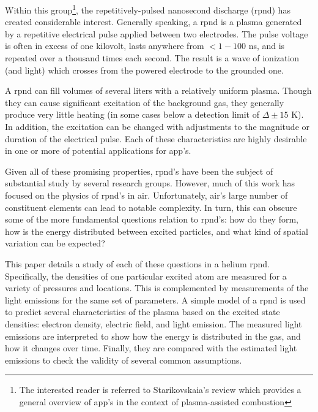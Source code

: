 Within this group\footnote{The interested reader is referred to Starikovskaia's
review \cite{Starikovskaia2006} which provides a general overview of \acs{app}'s
in the context of plasma-assisted combustion}, the repetitively-pulsed
nanosecond discharge (\acs{rpnd}) has created considerable interest. Generally
speaking, a \acs{rpnd} is a plasma generated by a repetitive electrical pulse
applied between two electrodes. The pulse voltage is often in excess of one
kilovolt, lasts anywhere from $<1-100$ ns, and is repeated over a thousand
times each second. The result is a wave of ionization (and light) which crosses
from the powered electrode to the grounded one.

A \acs{rpnd} can fill volumes of several liters with a relatively uniform
plasma. Though they can cause significant excitation of the background gas, they
generally produce very little heating (in some cases below a detection limit of
$\Delta \pm 15$ K). In addition, the excitation can be changed with adjustments
to the magnitude or duration of the electrical pulse. Each of these
characteristics are highly desirable in one or more of potential applications
for \acs{app}'s.

Given all of these promising properties, \acs{rpnd}'s have been the subject of
substantial study by several research groups. However, much of this work has
focused on the physics of \acs{rpnd}'s in air. Unfortunately, air's large number
of constituent elements can lead to notable complexity. In turn, this can
obscure some of the more fundamental questions relation to \acs{rpnd}'s: how do
they form, how is the energy distributed between excited particles, and what
kind of spatial variation can be expected?

This paper details a study of each of these questions in a helium \acs{rpnd}.
Specifically, the densities of one particular excited atom are measured for a
variety of pressures and locations. This is complemented by measurements of the
light emissions for the same set of parameters. A simple model of a \acs{rpnd}
is used to predict several characteristics of the plasma based on the excited
state densities: electron density, electric field, and light emission. The
measured light emissions are interpreted to show how the energy is distributed
in the gas, and how it changes over time. Finally, they are compared with the
estimated light emissions to check the validity of several common assumptions.


